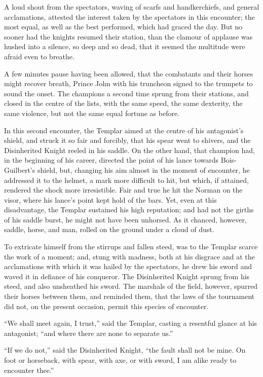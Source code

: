 A loud shout from the spectators, waving of scarfs and handkerchiefs,
and general acclamations, attested the interest taken by the spectators
in this encounter; the most equal, as well as the best performed, which
had graced the day. But no sooner had the knights resumed their station,
than the clamour of applause was hushed into a silence, so deep and so
dead, that it seemed the multitude were afraid even to breathe.

A few minutes pause having been allowed, that the combatants and their
horses might recover breath, Prince John with his truncheon signed to
the trumpets to sound the onset. The champions a second time sprung from
their stations, and closed in the centre of the lists, with the same
speed, the same dexterity, the same violence, but not the same equal
fortune as before.

In this second encounter, the Templar aimed at the centre of his
antagonist's shield, and struck it so fair and forcibly, that his spear
went to shivers, and the Disinherited Knight reeled in his saddle. On
the other hand, that champion had, in the beginning of his career,
directed the point of his lance towards Bois-Guilbert's shield, but,
changing his aim almost in the moment of encounter, he addressed it to
the helmet, a mark more difficult to hit, but which, if attained,
rendered the shock more irresistible. Fair and true he hit the Norman on
the visor, where his lance's point kept hold of the bars. Yet, even at
this disadvantage, the Templar sustained his high reputation; and had
not the girths of his saddle burst, he might not have been unhorsed. As
it chanced, however, saddle, horse, and man, rolled on the ground under
a cloud of dust.

To extricate himself from the stirrups and fallen steed, was to the
Templar scarce the work of a moment; and, stung with madness, both at
his disgrace and at the acclamations with which it was hailed by the
spectators, he drew his sword and waved it in defiance of his conqueror.
The Disinherited Knight sprung from his steed, and also unsheathed his
sword. The marshals of the field, however, spurred their horses between
them, and reminded them, that the laws of the tournament did not, on the
present occasion, permit this species of encounter.

``We shall meet again, I trust,'' said the Templar, casting a resentful
glance at his antagonist; ``and where there are none to separate us.''

``If we do not,'' said the Disinherited Knight, ``the fault shall not be
mine. On foot or horseback, with spear, with axe, or with sword, I am
alike ready to encounter thee.''

